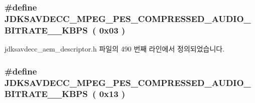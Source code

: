 \subsubsection[{\texorpdfstring{J\+D\+K\+S\+A\+V\+D\+E\+C\+C\+\_\+\+M\+P\+E\+G\+\_\+\+P\+E\+S\+\_\+\+C\+O\+M\+P\+R\+E\+S\+S\+E\+D\+\_\+\+A\+U\+D\+I\+O\+\_\+\+B\+I\+T\+R\+A\+T\+E\+\_\+32\+\_\+\+K\+B\+PS}{JDKSAVDECC_MPEG_PES_COMPRESSED_AUDIO_BITRATE_32_KBPS}}]{\setlength{\rightskip}{0pt plus 5cm}\#define J\+D\+K\+S\+A\+V\+D\+E\+C\+C\+\_\+\+M\+P\+E\+G\+\_\+\+P\+E\+S\+\_\+\+C\+O\+M\+P\+R\+E\+S\+S\+E\+D\+\_\+\+A\+U\+D\+I\+O\+\_\+\+B\+I\+T\+R\+A\+T\+E\+\_\+\_\+\+K\+B\+PS~( 0x03 )}\hypertarget{group__mpeg__pes__compressed__audio__bitrate_ga8898d1b0fbfc554a0f551e02443293b0}{}\label{group__mpeg__pes__compressed__audio__bitrate_ga8898d1b0fbfc554a0f551e02443293b0}


jdksavdecc\+\_\+aem\+\_\+descriptor.\+h 파일의 490 번째 라인에서 정의되었습니다.

\subsubsection[{\texorpdfstring{J\+D\+K\+S\+A\+V\+D\+E\+C\+C\+\_\+\+M\+P\+E\+G\+\_\+\+P\+E\+S\+\_\+\+C\+O\+M\+P\+R\+E\+S\+S\+E\+D\+\_\+\+A\+U\+D\+I\+O\+\_\+\+B\+I\+T\+R\+A\+T\+E\+\_\+352\+\_\+\+K\+B\+PS}{JDKSAVDECC_MPEG_PES_COMPRESSED_AUDIO_BITRATE_352_KBPS}}]{\setlength{\rightskip}{0pt plus 5cm}\#define J\+D\+K\+S\+A\+V\+D\+E\+C\+C\+\_\+\+M\+P\+E\+G\+\_\+\+P\+E\+S\+\_\+\+C\+O\+M\+P\+R\+E\+S\+S\+E\+D\+\_\+\+A\+U\+D\+I\+O\+\_\+\+B\+I\+T\+R\+A\+T\+E\+\_\+\_\+\+K\+B\+PS~( 0x13 )}\hypertarget{group__mpeg__pes__compressed__audio__bitrate_ga0fd6b9542a814a134df9fdcc9bca62c6}{}\label{group__mpeg__pes__compressed__audio__bitrate_ga0fd6b9542a814a134df9fdcc9bca62c6}


